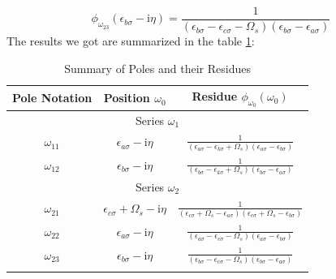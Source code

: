 \documentclass[12pt]{caltech_thesis}
\begin{document}
\begin{equation}
\phi_{\omega_{23}}(\epsilon_{b \sigma} - \mathrm{i} \eta) = \frac{1}{(\epsilon_{b \sigma} -\epsilon_{c \sigma}-\Omega_s)(\epsilon_{b \sigma} -\epsilon_{a \sigma})}
\end{equation}
The results we got are summarized in the table \ref{tab:poles_residues_virtual}:\\
\begin{table}[h]
\centering
\caption{Summary of Poles and their Residues}
\begin{tabular}{|c|c|c|}
\hline
Pole Notation & Position $\omega_0$ & Residue $\phi_{\omega_0}(\omega_0)$ \\
\hline
\multicolumn{3}{|c|}{Series $\omega_1$} \\
\hline
$\omega_{11}$ & $\epsilon_{a \sigma} - \mathrm{i} \eta$ & $\frac{1}{(\epsilon_{a \sigma} -\epsilon_{k \sigma}+\Omega_s)(\epsilon_{a \sigma} -\epsilon_{b \sigma})}$ \\
$\omega_{12}$ & $\epsilon_{b \sigma} - \mathrm{i} \eta$ & $\frac{1}{(\epsilon_{b \sigma} -\epsilon_{k \sigma}+\Omega_s)(\epsilon_{b \sigma} -\epsilon_{a \sigma})}$ \\
\hline
\multicolumn{3}{|c|}{Series $\omega_2$} \\
\hline
$\omega_{21}$ & $\epsilon_{c \sigma} + \Omega_s - \mathrm{i} \eta$ & $\frac{1}{(\epsilon_{c \sigma} + \Omega_s -\epsilon_{a \sigma})(\epsilon_{c \sigma} + \Omega_s -\epsilon_{b \sigma})}$ \\
$\omega_{22}$ & $\epsilon_{a \sigma} - \mathrm{i} \eta$ & $\frac{1}{(\epsilon_{a \sigma} -\epsilon_{c \sigma}-\Omega_s)(\epsilon_{a \sigma} -\epsilon_{b \sigma})}$ \\
$\omega_{23}$ & $\epsilon_{b \sigma} - \mathrm{i} \eta$ & $\frac{1}{(\epsilon_{b \sigma} -\epsilon_{c \sigma}-\Omega_s)(\epsilon_{b \sigma} -\epsilon_{a \sigma})}$ \\
\hline
\label{tab:poles_residues_virtual}
\end{tabular}
\end{table}
\end{document}
